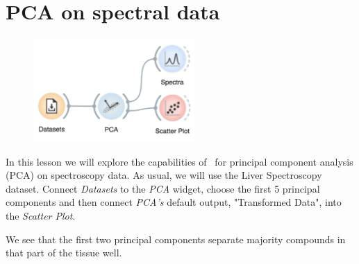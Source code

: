 \chapter{PCA on spectral data}
\label{ch:spectral-PCA}






\begin{figure}
    \centering
    \vspace{-2cm}
    \includegraphics[width=0.55\textwidth]{graphics/ch-spectral_PCA/spectral_PCA-fig1.png}
\end{figure}

In this lesson we will explore the capabilities of \mutation\ for principal component analysis (PCA) on spectroscopy data. As usual, we will use the Liver Spectroscopy dataset. Connect \textit{Datasets} to the \textit{PCA} widget, choose the first 5 principal components and then connect \textit{PCA’s} default output, "Transformed Data", into the \textit{Scatter Plot}. 

We see that the first two principal components separate majority compounds in that part of the tissue well. 



